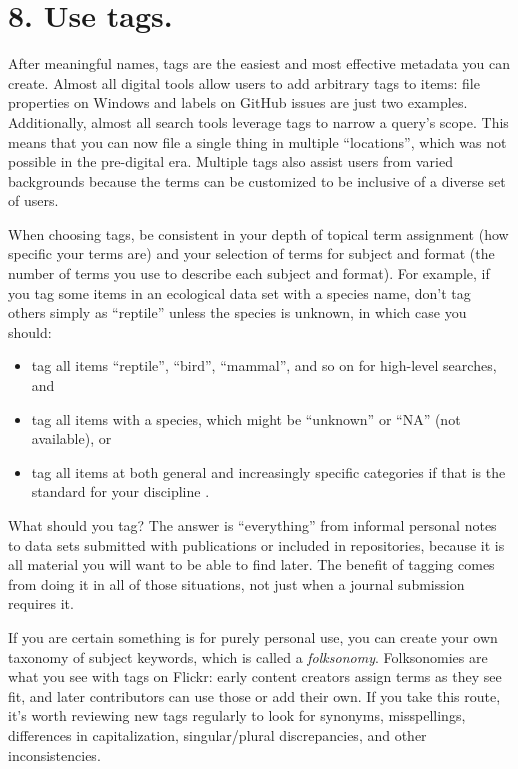 \documentclass[10pt,letterpaper]{article}
\newcommand{\rulemajor}[1]{\section*{#1}}
\begin{document}
\rulemajor{8. Use tags.}

After meaningful names, tags are the easiest and most effective metadata you can
create. Almost all digital tools allow users to add arbitrary tags to items:
file properties on Windows and labels on GitHub issues are just two examples.
Additionally, almost all search tools leverage tags to narrow a query's scope.
This means that you can now file a single thing in multiple ``locations'', which
was not possible in the pre-digital era. Multiple tags also assist users from
varied backgrounds because the terms can be customized to be inclusive of a
diverse set of users.

When choosing tags, be consistent in your depth of topical term assignment (how
specific your terms are) and your selection of terms for subject and format (the
number of terms you use to describe each subject and format). For example, if
you tag some items in an ecological data set with a species name, don't tag
others simply as ``reptile'' unless the species is unknown, in which case you
should:

\begin{itemize}

\item
  tag all items ``reptile'', ``bird'', ``mammal'', and so on for high-level
  searches, and

\item
  tag all items with a species, which might be ``unknown'' or ``NA'' (not
  available), or
  
\item
  tag all items at both general and increasingly specific categories if that is
  the standard for your discipline \cite{FAIR2020}.

\end{itemize}

What should you tag?  The answer is ``everything'' from informal personal notes
to data sets submitted with publications or included in repositories, because it
is all material you will want to be able to find later. The benefit of tagging
comes from doing it in all of those situations, not just when a journal
submission requires it.

If you are certain something is for purely personal use, you can create your own
taxonomy of subject keywords, which is called a \emph{folksonomy}. Folksonomies
are what you see with tags on Flickr: early content creators assign terms as
they see fit, and later contributors can use those or add their own. If you
take this route, it's worth reviewing new tags regularly to look for synonyms,
misspellings, differences in capitalization, singular/plural discrepancies, and
other inconsistencies.
\end{document}
